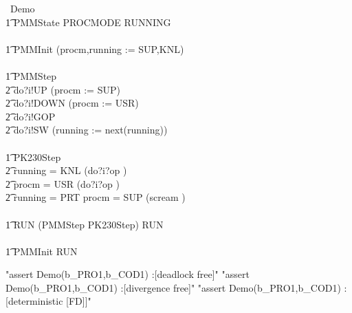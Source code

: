 \begin{circus}
\circprocess\ Demo \circdef \circbegin \\
\t1 \circstate PMMState  PROCMODE \land RUNNING \\
\\
\t1 PMMInit \circdef (procm,running := SUP,KNL) \\
\\
\t1 PMMStep \circdef \\
\t2             do?i!UP \then (procm := SUP) \circseq \Skip \\
\t2 \extchoice  do?i!DOWN \then (procm := USR) \circseq \Skip \\
\t2 \extchoice  do?i!GOP \then \Skip \\
\t2 \extchoice  do?i!SW \then (running := next(running)) \circseq \Skip \\
\\
\t1 PK230Step \circdef \\
\t2 \lcircguard running = KNL \rcircguard \circguard (do?i?op \then \Skip)\\
\t2 \extchoice \lcircguard procm = USR \rcircguard \circguard (do?i?op \then \Skip)\\
\t2 \extchoice \lcircguard running = PRT \land procm = SUP \rcircguard \circguard (scream \then \Stop)\\
\\
\t1 RUN \circdef (PMMStep \interleave PK230Step) \circseq RUN \\
\\
\t1 \circspot PMMInit \circseq RUN \\
\circend
\end{circus}

\begin{assert}
"assert Demo(b_PRO1,b_COD1) :[deadlock free]"
\also
"assert Demo(b_PRO1,b_COD1) :[divergence free]"
\also
"assert Demo(b_PRO1,b_COD1) :[deterministic [FD]]"
\end{assert}
